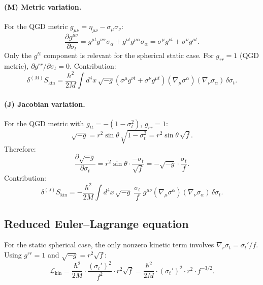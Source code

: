 \documentclass[11pt,a4paper]{article}
\theoremstyle{plain}
\theoremstyle{definition}
\newcommand{\sig}{\sigma}
\newcommand{\sigt}{\sigma_t}
\newcommand{\Skin}{S_{\mathrm{kin}}}
\begin{document}
\paragraph{(M) Metric variation.}
For the QGD metric $g_{\mu\nu} = \eta_{\mu\nu} - \sig_\mu\sig_\nu$:
\begin{equation}\label{eq:dginv}
  \frac{\partial g^{\mu\nu}}{\partial\sigt}
  = g^{\mu t}g^{\nu\alpha}\sig_\alpha + g^{\nu t}g^{\mu\alpha}\sig_\alpha
  = \sig^\mu g^{\nu t} + \sig^\nu g^{\mu t}.
\end{equation}
Only the $g^{tt}$ component is relevant for the spherical static case.
For $g_{rr}=1$ (QGD metric), $\partial g^{rr}/\partial\sigt = 0$.
Contribution:
\begin{equation}\label{eq:metric_var}
  \delta^{(M)}\Skin
  = \frac{\hbar^2}{2M}\int d^4x\,\sqrt{-g}
    \left(\sig^\mu g^{\nu t} + \sig^\nu g^{\mu t}\right)
    (\nabla_\mu\sig^\alpha)(\nabla_\nu\sig_\alpha)\,\delta\sigt.
\end{equation}

\paragraph{(J) Jacobian variation.}
For the QGD metric with $g_{tt} = -(1-\sigt^2)$, $g_{rr}=1$:
\begin{equation}
  \sqrt{-g} = r^2\sin\theta\,\sqrt{1-\sigt^2} = r^2\sin\theta\,\sqrt{f}.
\end{equation}
Therefore:
\begin{equation}\label{eq:jac_var}
  \frac{\partial\sqrt{-g}}{\partial\sigt}
  = r^2\sin\theta\cdot\frac{-\sigt}{\sqrt{f}}
  = -\sqrt{-g}\cdot\frac{\sigt}{f}.
\end{equation}
Contribution:
\begin{equation}\label{eq:jacobian_var}
  \delta^{(J)}\Skin
  = -\frac{\hbar^2}{2M}\int d^4x\,\sqrt{-g}\;
    \frac{\sigt}{f}\;
    g^{\mu\nu}(\nabla_\mu\sig^\alpha)(\nabla_\nu\sig_\alpha)\,\delta\sigt.
\end{equation}

\subsection{Reduced Euler--Lagrange equation}

For the static spherical case, the only nonzero kinetic term involves
$\nabla_r\sigt = \sigt'/f$. Using $g^{rr}=1$ and $\sqrt{-g}=r^2\sqrt{f}$:
\begin{equation}\label{eq:L_kin}
  \mathcal{L}_{\mathrm{kin}} = \frac{\hbar^2}{2M}\cdot
    \frac{(\sigt')^2}{f^2}\cdot r^2\sqrt{f}
  = \frac{\hbar^2}{2M}\cdot(\sigt')^2\cdot r^2\cdot f^{-3/2}.
\end{equation}
\end{document}
